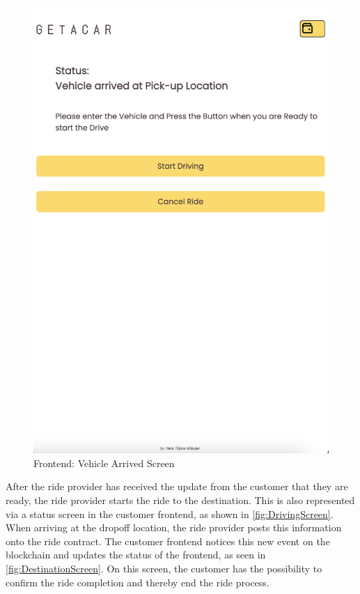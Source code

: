 \begin{figure}[H]
    \hfill
    \begin{minipage}{0.45\linewidth}
        \centering
        \includegraphics[width=\linewidth]{data/ffss/8.png}
        \caption{Frontend: Vehicle Arrived Screen}
        \label{fig:VehicleArrivedScreen}
    \end{minipage}
    
\end{figure}

After the ride provider has received the update from the customer that they are ready, the ride provider starts the ride to the destination. This is also represented via a status screen in the customer frontend, as shown in \ref{fig:DrivingScreen}. When arriving at the dropoff location, the ride provider posts this information onto the ride contract. The customer frontend notices this new event on the blockchain and updates the status of the frontend, as seen in \ref{fig:DestinationScreen}. On this screen, the customer has the possibility to confirm the ride completion and thereby end the ride process.

